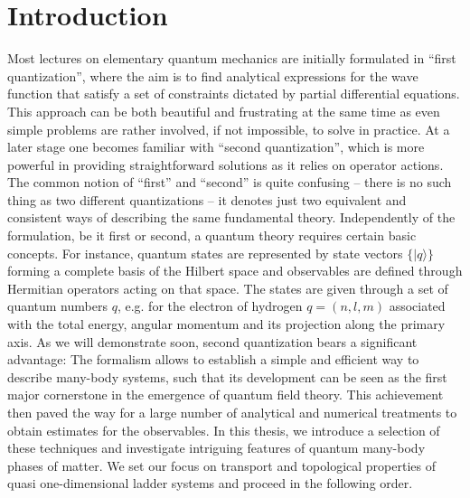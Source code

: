 %
\chapter*{Introduction}
%
Most lectures on elementary quantum mechanics are initially formulated in ``first quan\-ti\-zation'', where the aim is to find analytical expressions for the wave function that satisfy a set of constraints dictated by partial differential equations.
This approach can be both beautiful and frustrating at the same time as even simple problems are rather involved, if not impossible, to solve in practice.
At a later stage one becomes familiar with ``second quantization'', which is more powerful in providing straightforward solutions as it relies on operator actions.
The common notion of ``first'' and ``second'' is quite confusing -- there is no such thing as two different quantizations -- it denotes just two equivalent and consistent ways of describing the same fundamental theory.
Independently of the formulation, be it first or second, a quantum theory requires certain basic concepts.
For instance, quantum states are represented by state vectors $\{|q\rangle\}$ forming a complete basis of the Hilbert space and observables are defined through Hermitian operators acting on that space.
The states are given through a set of quantum numbers $q$, e.g. for the electron of hydrogen $q=(n,l,m)$ associated with the total energy, angular momentum and its projection along the primary axis.
As we will demonstrate soon, second quantization bears a significant advantage: The formalism allows to establish a simple and efficient way to describe many-body systems, such that its development can be seen as the first major cornerstone in the emergence of quantum field theory.
This achievement then paved the way for a large number of analytical and numerical treatments to obtain estimates for the observables.
In this thesis, we introduce a selection of these techniques and investigate intriguing features of quantum many-body phases of matter.
We set our focus on transport and topological properties of quasi one-dimensional ladder systems and proceed in the following order.

